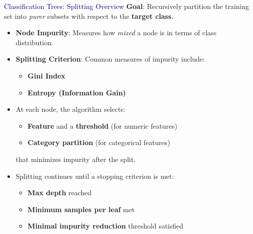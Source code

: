 \begin{frame}{\textcolor{darkblue}{Classification Trees: Splitting Overview}}
    \textbf{Goal}: Recursively partition the training set into \textit{purer} subsets with respect to the \textbf{target class}.

    \begin{itemize}
        \item \textbf{Node Impurity}: Measures how \emph{mixed} a node is in terms of class distribution.
        \item \textbf{Splitting Criterion}: Common measures of impurity include:
            \begin{itemize}
                \item \textbf{Gini Index}
                \item \textbf{Entropy (Information Gain)}
            \end{itemize}
        \item At each node, the algorithm selects:
            \begin{itemize}
                \item \textbf{Feature} and a \textbf{threshold} (for numeric features)
                \item \textbf{Category partition} (for categorical features)
            \end{itemize}
            that minimizes impurity after the split.
        \item Splitting continues until a stopping criterion is met:
            \begin{itemize}
                \item \textbf{Max depth} reached
                \item \textbf{Minimum samples per leaf} met
                \item \textbf{Minimal impurity reduction} threshold satisfied
            \end{itemize}
    \end{itemize}
\end{frame}

